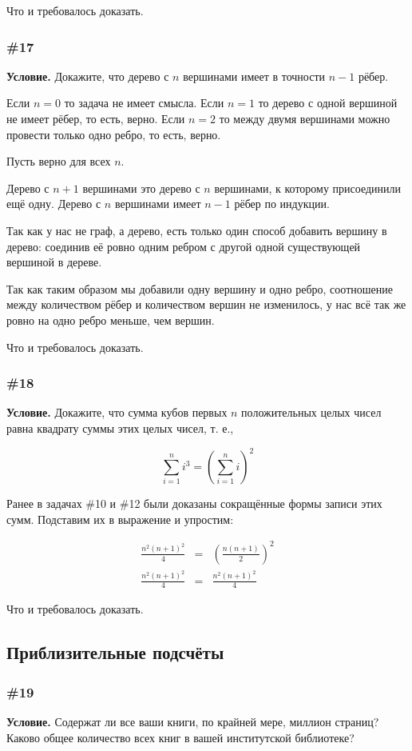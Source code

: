 \documentclass{article}
\begin{document}
Что и требовалось доказать.

\subsubsection{\#17}

\textbf{Условие.}
Докажите, что дерево с \(n\) вершинами имеет в точности \(n - 1\) рёбер.

Если \(n = 0\) то задача не имеет смысла.
Если \(n = 1\) то дерево с одной вершиной не имеет рёбер, то есть, верно.
Если \(n = 2\) то между двумя вершинами можно провести только одно ребро, то есть, верно.

Пусть верно для всех \(n\).

Дерево с \(n+1\) вершинами это дерево с \(n\) вершинами, к которому присоединили ещё одну.
Дерево с \(n\) вершинами имеет \(n-1\) рёбер по индукции.

Так как у нас не граф, а дерево, есть только один способ добавить вершину в дерево:
соединив её ровно одним ребром с другой одной существующей вершиной в дереве.

Так как таким образом мы добавили одну вершину и одно ребро,
соотношение между количеством рёбер и количеством вершин не изменилось,
у нас всё так же ровно на одно ребро меньше, чем вершин.

Что и требовалось доказать.

\subsubsection{\#18}

\textbf{Условие.}
Докажите, что сумма кубов первых \(n\) положительных целых чисел равна квадрату суммы этих целых чисел,
т. е.,

\begin{equation}
    \sum_{i=1}^n i^3 = \left(\sum_{i=1}^n i \right)^2
\end{equation}

Ранее в задачах \#10 и \#12 были доказаны сокращённые формы записи этих сумм.
Подставим их в выражение и упростим:

\begin{eqnarray}
    \frac{n^2(n+1)^2}{4} &=& \left( \frac{n(n+1)}{2} \right)^2\\
    \frac{n^2(n+1)^2}{4} &=& \frac{n^2(n+1)^2}{4}
\end{eqnarray}

Что и требовалось доказать.

\subsection{Приблизительные подсчёты}

\subsubsection{\#19}

\textbf{Условие.}
Содержат ли все ваши книги, по крайней мере, миллион страниц?
Каково общее количество всех книг в вашей институтской библиотеке?
\end{document}
